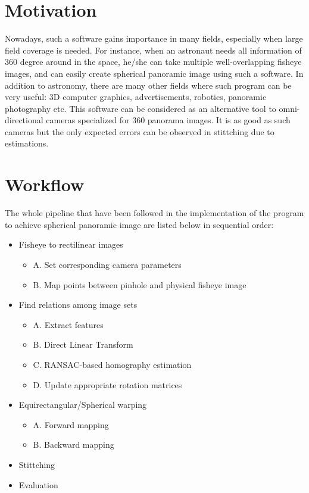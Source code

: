 \documentclass{article}
\begin{document}
\section*{Motivation}
Nowadays, such a software gains importance in many fields, especially when large field coverage is needed. For instance, when an astronaut needs all information of 360 degree around in the space, he/she can take multiple well-overlapping fisheye images, and can easily create spherical panoramic image using such a software. In addition to astronomy, there are many other fields where such program can be very useful: 3D computer graphics, advertisements, robotics, panoramic photography etc. This software can be considered as an alternative tool to omni-directional cameras specialized for 360 panorama images. It is as good as such cameras but the only expected errors can be observed in stittching due to estimations.

\section*{Workflow}
The whole pipeline that have been followed in the implementation of the program to achieve spherical panoramic image are listed below in sequential order:
\begin{itemize}
    \item Fisheye to rectilinear images
    \begin{itemize}
		\item A. Set corresponding camera parameters
    		\item B. Map points between pinhole and physical fisheye image
    \end{itemize} 
    \item Find relations among image sets
    \begin{itemize}
    		\item A. Extract features
    		\item B. Direct Linear Transform
    		\item C. RANSAC-based homography estimation
    		\item D. Update appropriate rotation matrices
    \end{itemize}
    \item Equirectangular/Spherical warping
    \begin{itemize}
		\item A. Forward mapping
		\item B. Backward mapping
    \end{itemize}  
    \item Stittching
    \item Evaluation
\end{itemize}
\ \\~\\
\end{document}
